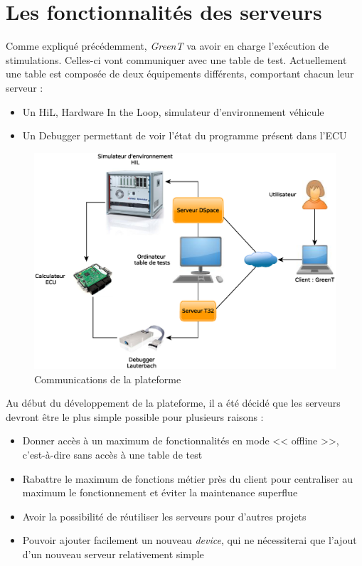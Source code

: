 \section{Les fonctionnalités des serveurs}\label{wbgt}
Comme expliqué précédemment, \textit{GreenT} va avoir en charge l'exécution de stimulations. Celles-ci vont communiquer avec une table de
test. Actuellement une table est composée de deux équipements différents, comportant chacun leur serveur : 
\begin{itemize}
	\item Un HiL, Hardware In the Loop, simulateur d'environnement véhicule
	\item Un Debugger permettant de voir l'état du programme présent dans l'ECU
\end{itemize}

\begin{figure}[H]
	\centering
	\includegraphics[width=17cm]{contents/images/network.eps}
	\caption{Communications de la plateforme}
	\label{fig:wbgt}
\end{figure}

Au début du développement de la plateforme, il a été décidé que les serveurs devront être le plus simple possible pour plusieurs raisons
: 
\begin{itemize}
	\item Donner accès à un maximum de fonctionnalités en mode << offline >>, c'est-à-dire sans accès à une table de test
	\item Rabattre le maximum de fonctions métier près du client pour centraliser au maximum le fonctionnement et éviter la maintenance superflue
	\item Avoir la possibilité de réutiliser les serveurs pour d'autres projets
	\item Pouvoir ajouter facilement un nouveau \textit{device}, qui ne nécessiterai que l'ajout d'un nouveau serveur relativement simple
\end{itemize}

